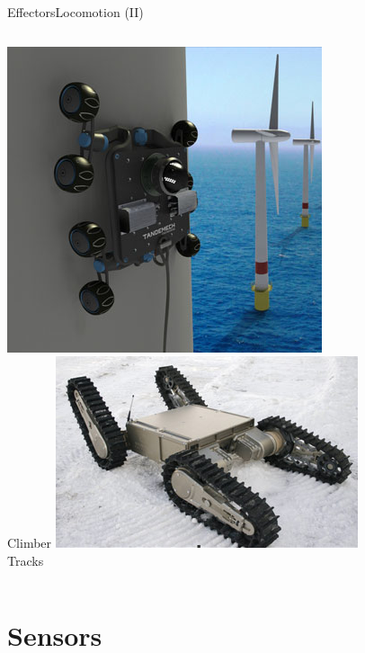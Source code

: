 \documentclass[10pt,compress]{beamer} %
\begin{document}
\begin{frame}{Effectors}{Locomotion (II)}
\begin{columns}
		\centering \includegraphics[width=\linewidth]{figs/climber.jpg}\\Climber
		\centering \includegraphics[width=\linewidth]{figs/tracks.jpg}\\Tracks
		\end{columns}
\end{frame}

\section{Sensors}
\end{document}
